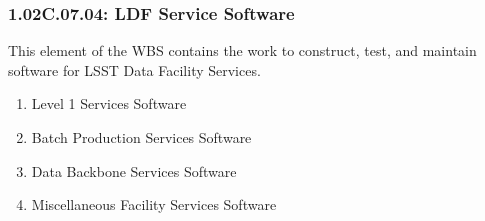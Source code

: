 \subsubsection*{1.02C.07.04: LDF Service Software}

This element of the WBS contains the work to construct, test, and maintain software for LSST Data Facility Services.

\begin{enumerate}

  \item{Level 1 Services Software}
  \item{Batch Production Services Software}
  \item{Data Backbone Services Software}
  \item{Miscellaneous Facility Services Software}

\end{enumerate}

